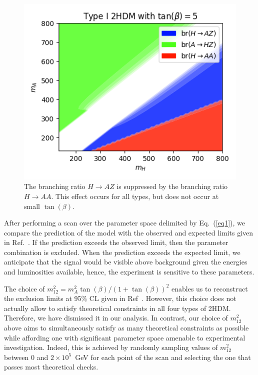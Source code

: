 \begin{figure}[t!]
	\centering
    \includegraphics[width=.5\textwidth]{branching_ratios_HAA.png}
    \caption{The branching ratio \(H\rightarrow AZ\) is suppressed by the branching ratio \(H\rightarrow AA\).
             This effect occurs for all types, but does not occur at small \(\tan(\beta)\).}\label{fig:2HDMparamssuppress}
\end{figure}

After performing a scan over the parameter space delimited by Eq.~(\ref{eq1}), we compare the prediction of the model with the observed and expected limits given in Ref.~\cite{Aaboud2018AZHbbll}.
If the prediction exceeds the observed limit, then the parameter combination is excluded.
When the prediction exceeds the expected limit, we anticipate that the signal would be visible above background given the energies and luminosities available, hence,  {the experiment is sensitive to these parameters.} %


The choice of \(m^2_{12} = m_A^2 \tan(\beta) / (1 + \tan(\beta))^2\) enables us to reconstruct the exclusion limits at 95\%  CL given in Ref~\cite{Aaboud2018AZHbbll}.
However, this choice does not actually allow to satisfy theoretical constraints in all four types of 2HDM.
Therefore, we have dismissed it in our analysis.
In contrast, our choice of \(m_{12}^2\) above aims to simultaneously satisfy as many theoretical constraints as possible while affording one with significant parameter space amenable to experimental investigation.
Indeed, this is achieved by randomly sampling values of \(m^2_{12}\) between \(0\) and \(2\times 10^{5}\)~GeV for each point of the scan and selecting the one that passes most theoretical checks.


